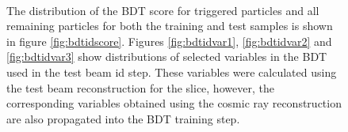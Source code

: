 \begin{figure}
 \\
\caption{The distribution of the BDT score for triggered particles and all remaining particles for both the training and test samples is shown in figure \ref{fig:bdtidscore}.  Figures \ref{fig:bdtidvar1}, \ref{fig:bdtidvar2} and \ref{fig:bdtidvar3} show distributions of selected variables in the BDT used in the test beam id step.  These variables were calculated using the test beam reconstruction for the slice, however, the corresponding variables obtained using the cosmic ray reconstruction are also propagated into the BDT training step.}
\label{fig:bdtid}
\end{figure}

